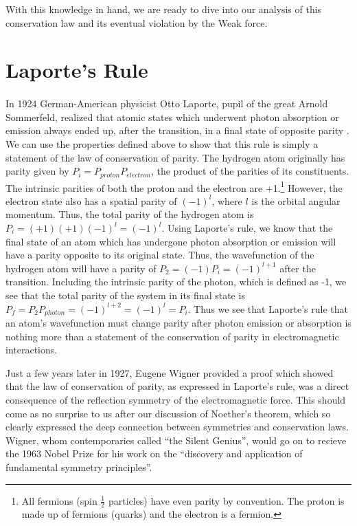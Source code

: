 \documentclass[12pt]{book}
\begin{document}
With this knowledge in hand, we are ready to dive into our analysis of this conservation law and its eventual violation by the Weak force.

\section{Laporte's Rule}

\paragraph*{}In 1924 German-American physicist Otto Laporte, pupil of the great Arnold Sommerfeld, realized that atomic states which underwent photon absorption or emission always ended up, after the transition, in a final state of opposite parity \cite{laporte}. We can use the properties defined above to show that this rule is simply a statement of the law of conservation of parity. The hydrogen atom originally has parity given by $P_{i}=P_{proton}P_{electron}$, the product of the parities of its constituents. The intrinsic parities of both the proton and the electron are +1.\footnote{All fermions (spin $\frac{1}{2}$ particles) have even parity by convention. The proton is made up of fermions (quarks) and the electron is a fermion.} However, the electron state also has a spatial parity of $(-1)^{l}$, where $l$ is the orbital angular momentum. Thus, the total parity of the hydrogen atom is $P_{i}=(+1)(+1)(-1)^{l}=(-1)^{l}$. Using Laporte's rule, we know that the final state of an atom which has undergone photon absorption or emission will have a parity opposite to its original state. Thus, the wavefunction of the hydrogen atom will have a parity of $P_{2}=(-1)P_{i}=(-1)^{l+1}$ after the transition. Including the intrinsic parity of the photon, which is defined as -1, we see that the total parity of the system in its final state is $P_{f}=P_{2}P_{photon}=(-1)^{l+2}=(-1)^{l}=P_{i}$. Thus we see that Laporte's rule that an atom's wavefunction must change parity after photon emission or absorption is nothing more than a statement of the conservation of parity in electromagnetic interactions.

Just a few years later in 1927, Eugene Wigner provided a proof which showed that the law of conservation of parity, as expressed in Laporte's rule, was a direct consequence of the reflection symmetry of the electromagnetic force\cite{yang}. This should come as no surprise to us after our discussion of Noether's theorem, which so clearly expressed the deep connection between symmetries and conservation laws. Wigner, whom contemporaries called ``the Silent Genius'', would go on to recieve the 1963 Nobel Prize for his work on the ``discovery and application of fundamental symmetry principles''.
\end{document}
